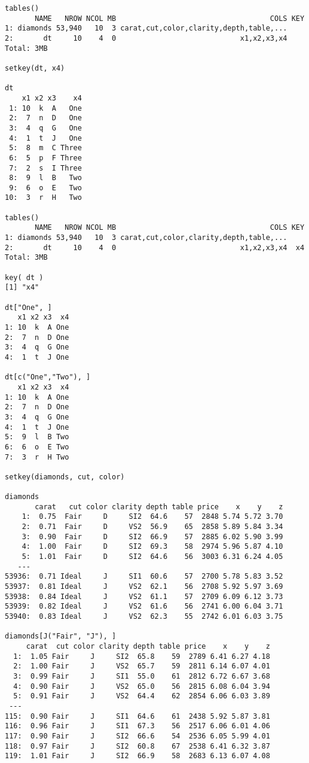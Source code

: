 \begin{lstlisting}[caption=Операции с таблици, label=listing0111]
tables()
       NAME   NROW NCOL MB                                    COLS KEY
1: diamonds 53,940   10  3 carat,cut,color,clarity,depth,table,...    
2:       dt     10    4  0                             x1,x2,x3,x4    
Total: 3MB

setkey(dt, x4)

dt
    x1 x2 x3    x4
 1: 10  k  A   One
 2:  7  n  D   One
 3:  4  q  G   One
 4:  1  t  J   One
 5:  8  m  C Three
 6:  5  p  F Three
 7:  2  s  I Three
 8:  9  l  B   Two
 9:  6  o  E   Two
10:  3  r  H   Two

tables()
       NAME   NROW NCOL MB                                    COLS KEY
1: diamonds 53,940   10  3 carat,cut,color,clarity,depth,table,...    
2:       dt     10    4  0                             x1,x2,x3,x4  x4
Total: 3MB

key( dt )
[1] "x4"

dt["One", ]
   x1 x2 x3  x4
1: 10  k  A One
2:  7  n  D One
3:  4  q  G One
4:  1  t  J One

dt[c("One","Two"), ]
   x1 x2 x3  x4
1: 10  k  A One
2:  7  n  D One
3:  4  q  G One
4:  1  t  J One
5:  9  l  B Two
6:  6  o  E Two
7:  3  r  H Two

setkey(diamonds, cut, color)

diamonds
       carat   cut color clarity depth table price    x    y    z
    1:  0.75  Fair     D     SI2  64.6    57  2848 5.74 5.72 3.70
    2:  0.71  Fair     D     VS2  56.9    65  2858 5.89 5.84 3.34
    3:  0.90  Fair     D     SI2  66.9    57  2885 6.02 5.90 3.99
    4:  1.00  Fair     D     SI2  69.3    58  2974 5.96 5.87 4.10
    5:  1.01  Fair     D     SI2  64.6    56  3003 6.31 6.24 4.05
   ---                                                           
53936:  0.71 Ideal     J     SI1  60.6    57  2700 5.78 5.83 3.52
53937:  0.81 Ideal     J     VS2  62.1    56  2708 5.92 5.97 3.69
53938:  0.84 Ideal     J     VS2  61.1    57  2709 6.09 6.12 3.73
53939:  0.82 Ideal     J     VS2  61.6    56  2741 6.00 6.04 3.71
53940:  0.83 Ideal     J     VS2  62.3    55  2742 6.01 6.03 3.75

diamonds[J("Fair", "J"), ]
     carat  cut color clarity depth table price    x    y    z
  1:  1.05 Fair     J     SI2  65.8    59  2789 6.41 6.27 4.18
  2:  1.00 Fair     J     VS2  65.7    59  2811 6.14 6.07 4.01
  3:  0.99 Fair     J     SI1  55.0    61  2812 6.72 6.67 3.68
  4:  0.90 Fair     J     VS2  65.0    56  2815 6.08 6.04 3.94
  5:  0.91 Fair     J     VS2  64.4    62  2854 6.06 6.03 3.89
 ---                                                          
115:  0.90 Fair     J     SI1  64.6    61  2438 5.92 5.87 3.81
116:  0.96 Fair     J     SI1  67.3    56  2517 6.06 6.01 4.06
117:  0.90 Fair     J     SI2  66.6    54  2536 6.05 5.99 4.01
118:  0.97 Fair     J     SI2  60.8    67  2538 6.41 6.32 3.87
119:  1.01 Fair     J     SI2  66.9    58  2683 6.13 6.07 4.08
\end{lstlisting}

